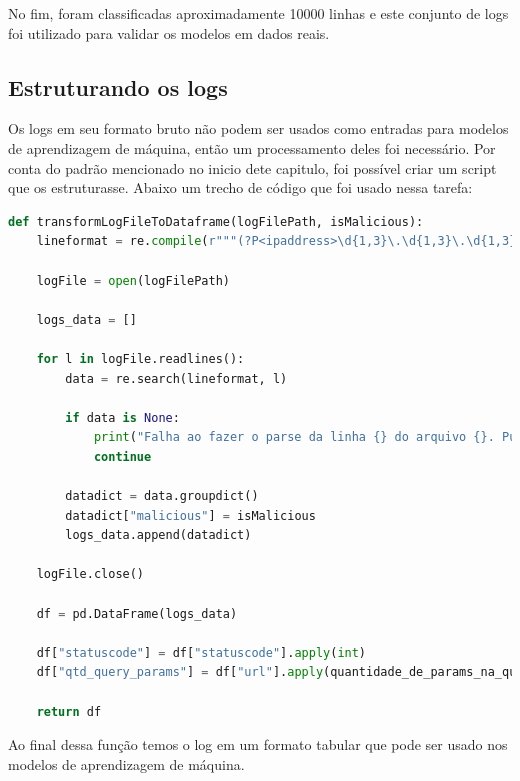 No fim, foram classificadas aproximadamente 10000 linhas e este conjunto de logs foi utilizado para validar os modelos em dados
reais.

\subsection{Estruturando os logs}

Os logs em seu formato bruto não podem ser usados como entradas para modelos de aprendizagem
de máquina, então um processamento deles foi necessário. Por conta do padrão mencionado no inicio 
dete capitulo, foi possível criar um script que os estruturasse. Abaixo um trecho de código
que foi usado nessa tarefa:

\begin{lstlisting}[language=Python]
def transformLogFileToDataframe(logFilePath, isMalicious):
    lineformat = re.compile(r"""(?P<ipaddress>\d{1,3}\.\d{1,3}\.\d{1,3}\.\d{1,3}) - - \[(?P<dateandtime>\d{2}\/[a-z]{3}\/\d{4}:\d{2}:\d{2}:\d{2} (\+|\-)\d{4})\] ((\"(GET|POST) )(?P<url>.+)(http\/[1-2]\.[0-9]")) (?P<statuscode>\d{3}) (?P<bytessent>\d+) (?P<refferer>-|"([^"]+)") (["](?P<useragent>[^"]+)["])""", re.IGNORECASE)

    logFile = open(logFilePath)

    logs_data = []

    for l in logFile.readlines():
        data = re.search(lineformat, l)

        if data is None:
            print("Falha ao fazer o parse da linha {} do arquivo {}. Pulando..".format(l, logFile))
            continue

        datadict = data.groupdict()
        datadict["malicious"] = isMalicious
        logs_data.append(datadict)

    logFile.close()

    df = pd.DataFrame(logs_data)

    df["statuscode"] = df["statuscode"].apply(int)
    df["qtd_query_params"] = df["url"].apply(quantidade_de_params_na_query)

    return df
\end{lstlisting}

Ao final dessa função temos o log em um formato tabular que pode ser usado nos modelos de aprendizagem de máquina.